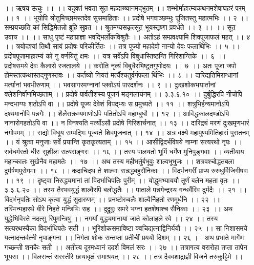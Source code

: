 ।। ऋषय ऊचुः ।। ।।
यदुक्तं भवता सूत महदाख्यानमद्भुतम् ।।
शम्भोर्माहात्म्यकथनमशेषाघहरं परम् ।। १ ।।
भूयोपि श्रोतुमिच्छामस्तदेव सुसमाहिताः ।।
प्रदोषे भगवाञ्छम्भुः पूजितस्तु महात्मभिः ।। २ ।।
सम्प्रयच्छति कां सिद्धिमेतन्नो ब्रूहि सुव्रत ।।
श्रुतमप्यसकृत्सूत भूयस्तृष्णा प्रवर्धते ।। ३ ।।
।। सूत उवाच ।। ।।
साधु पृष्टं महाप्राज्ञा भवद्भिर्लोकविश्रुतैः ।।
अतोऽहं सम्प्रवक्ष्यामि शिवपूजाफलं महत् ।। ४ ।।
त्रयोदश्यां तिथौ सायं प्रदोषः परिकीर्तितः ।।
तत्र पूज्यो महादेवो नान्यो देवः फलार्थिभिः ।। ५ ।।
प्रदोषपूजामाहात्म्यं को नु वर्णयितुं क्षमः ।।
यत्र सर्वेऽपि विबुधास्तिष्ठन्ति गिरिशान्तिके ।। ६ ।।
प्रदोषसमये देवः कैलासे रजतालये ।।
करोति नृत्यं विबुधैरभिष्टुतगुणोदयः ।। ७ ।।
अतः पूजा जपो होमस्तत्कथास्तद्गुणस्तवः ।।
कर्तव्यो नियतं मर्त्यैश्चतुर्वर्गफला र्थिभिः ।। ८ ।।
दारिद्यतिमिरान्धानां मर्त्यानां भवभीरुणाम् ।।
भवसागरमग्नानां प्लवोऽयं पारदर्शनः ।। ९ ।।
दुःखशोकभयार्तानां क्लेशनिर्वाणमिच्छताम् ।।
प्रदोषे पार्वतीशस्य पूजनं मङ्गलायनम् ।। ३.३.६.१० ।।
दुर्बुद्धिरपि नीचोपि मन्दभाग्यः शठोऽपि वा ।।
प्रदोषे पूज्य देवेशं विपद्भ्यः स प्रमुच्यते ।। ११ ।।
शत्रुभिर्हन्यमानोऽपि दश्यमानोपि पन्नगैः ।।
शैलैराक्रम्यमाणोऽपि पतितोऽपि महाम्बुधौ ।। १२ ।।
आविद्धकालदण्डोऽपि नानारोगहतोऽपि वा ।।
न विनश्यति मर्त्योऽसौ प्रदोषे गिरिशार्चनात् ।। १३ ।।
दारिद्र्यं मरणं दुःखमृणभारं नगोपमम् ।।
सद्यो विधूय सम्पद्भिः पूज्यते शिवपूजनात् ।। १४ ।।
अत्र वक्ष्ये महापुण्यमितिहासं पुरातनम् ।।
यं श्रुत्वा मनुजाः सर्वे प्रयान्ति कृतकृत्यताम् ।। १५ ।।
आसीद्विदर्भविषये नाम्ना सत्यरथो नृपः ।।
सर्वधर्मरतो धीरः सुशीलः सत्यसङ्गरः ।। १६ ।।
तस्य पालयतो भूमिं धर्मेण मुनिपुङ्गवाः ।।
व्यतीयाय महान्कालः सुखेनैव महामतेः ।। १७ ।।
अथ तस्य महीभर्तुर्बभूवुः शाल्वभूभुजः ।।
शत्रवश्चोद्धतबला दुर्मर्षणपुरोगमाः ।। १८ ।।
कदाचिदथ ते शाल्वाः सन्नद्धबहुसैनिकाः ।।
विदर्भनगरीं प्राप्य रुरुधुर्विजिगीषवः ।। १९ ।।
दृष्ट्वा निरुद्ध्यमानां तां विदर्भाधिपतिः पुरीम् ।।
योद्धुमभ्याययौ तूर्णं बलेन महता वृतः ।। ३.३.६.२० ।।
तस्य तैरभवयुद्धं शाल्वैरपि बलोद्धतैः ।।
पाताले पन्नगेन्द्रस्य गन्धर्वैरिव दुर्मदैः ।। २१ ।।
विदर्भनृपतिः सोऽथ कृत्वा युद्धं सुदारुणम् ।।
प्रनष्टोरुबलैः शाल्वैर्निहतो रणमूर्धनि ।। २२ ।।
तस्मिन्महारथे वीरे निहते मन्त्रिभिः सह ।।
दुद्रुवुः समरे भग्ना हतशेषाश्च सैनिकाः ।। २३ ।।
अथ युद्धेभिविरते नदत्सु रिपुमन्त्रिषु ।।
नगर्यां युद्ध्यमानायां जाते कोलाहले रवे ।। २४ ।।
तस्य सत्यरथस्यैका विदर्भाधिपतेः सती ।।
भूरिशोकसमाविष्टा क्वचिद्यत्नाद्विनिर्ययौ ।। २५ ।।
सा निशासमये यत्नादन्तर्वत्नी नृपाङ्गना ।।
निर्गता शोक सन्तप्ता प्रतीचीं प्रययौ दिशम् ।। २६ ।।
अथ प्रभाते मार्गेण गच्छन्ती शनकैः सती ।।
अतीत्य दूरमध्वानं ददर्श विमलं सरः ।। २७ ।।
तत्रागत्य वरारोहा तप्ता तापेन भूयसा ।।
विलसन्तं सरस्तीरे छायावृक्षं समाश्रयत् ।। २८ ।।
तत्र दैववशाद्राज्ञी विजने तरुकुट्टिमे ।।
